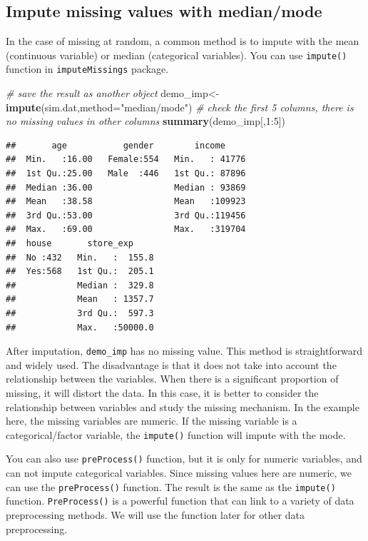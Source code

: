 \documentclass[12pt,]{krantz}
\newenvironment{Shaded}{\begin{snugshade}}{\end{snugshade}}
\newcommand{\KeywordTok}[1]{\textcolor[rgb]{0.13,0.29,0.53}{\textbf{{#1}}}}
\newcommand{\DataTypeTok}[1]{\textcolor[rgb]{0.13,0.29,0.53}{{#1}}}
\newcommand{\DecValTok}[1]{\textcolor[rgb]{0.00,0.00,0.81}{{#1}}}
\newcommand{\StringTok}[1]{\textcolor[rgb]{0.31,0.60,0.02}{{#1}}}
\newcommand{\CommentTok}[1]{\textcolor[rgb]{0.56,0.35,0.01}{\textit{{#1}}}}
\newcommand{\NormalTok}[1]{{#1}}
\theoremstyle{definition}
\theoremstyle{definition}
\theoremstyle{remark}
\begin{document}
\subsection{Impute missing values with
median/mode}\label{impute-missing-values-with-medianmode}

In the case of missing at random, a common method is to impute with the
mean (continuous variable) or median (categorical variables). You can
use \texttt{impute()} function in \texttt{imputeMissings} package.

\begin{Shaded}
\begin{Highlighting}[]
\CommentTok{# save the result as another object}
\NormalTok{demo_imp<-}\KeywordTok{impute}\NormalTok{(sim.dat,}\DataTypeTok{method=}\StringTok{"median/mode"}\NormalTok{)}
\CommentTok{# check the first 5 columns, there is no missing values in other columns}
\KeywordTok{summary}\NormalTok{(demo_imp[,}\DecValTok{1}\NormalTok{:}\DecValTok{5}\NormalTok{])}
\end{Highlighting}
\end{Shaded}

\begin{verbatim}
##       age           gender        income      
##  Min.   :16.00   Female:554   Min.   : 41776  
##  1st Qu.:25.00   Male  :446   1st Qu.: 87896  
##  Median :36.00                Median : 93869  
##  Mean   :38.58                Mean   :109923  
##  3rd Qu.:53.00                3rd Qu.:119456  
##  Max.   :69.00                Max.   :319704  
##  house       store_exp      
##  No :432   Min.   :  155.8  
##  Yes:568   1st Qu.:  205.1  
##            Median :  329.8  
##            Mean   : 1357.7  
##            3rd Qu.:  597.3  
##            Max.   :50000.0
\end{verbatim}

After imputation, \texttt{demo\_imp} has no missing value. This method
is straightforward and widely used. The disadvantage is that it does not
take into account the relationship between the variables. When there is
a significant proportion of missing, it will distort the data. In this
case, it is better to consider the relationship between variables and
study the missing mechanism. In the example here, the missing variables
are numeric. If the missing variable is a categorical/factor variable,
the \texttt{impute()} function will impute with the mode.

You can also use \texttt{preProcess()} function, but it is only for
numeric variables, and can not impute categorical variables. Since
missing values here are numeric, we can use the \texttt{preProcess()}
function. The result is the same as the \texttt{impute()} function.
\texttt{PreProcess()} is a powerful function that can link to a variety
of data preprocessing methods. We will use the function later for other
data preprocessing.
\end{document}
